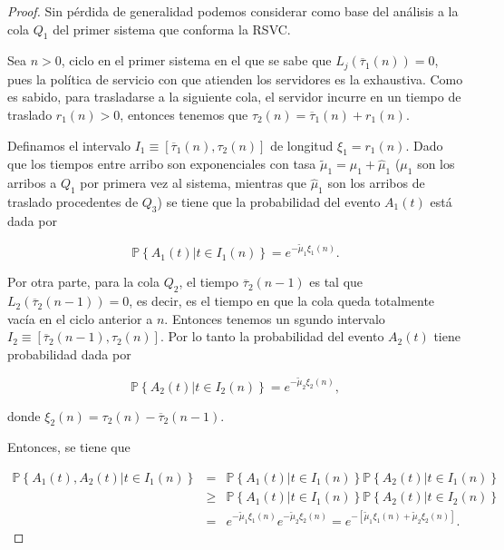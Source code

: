 \documentclass{article}
\newcommand{\prob}{\mathbb{P}}
\begin{document}
\begin{proof}
Sin p\'erdida de generalidad podemos considerar como base del an\'alisis a la cola $Q_{1}$ del primer sistema que conforma la RSVC.

Sea $n>0$, ciclo en el primer sistema en el que se sabe que $L_{j}\left(\overline{\tau}_{1}\left(n\right)\right)=0$, pues la pol\'itica de servicio con que atienden los servidores es la exhaustiva. Como es sabido, para trasladarse a la siguiente cola, el servidor incurre en un tiempo de traslado $r_{1}\left(n\right)>0$, entonces tenemos que $\tau_{2}\left(n\right)=\overline{\tau}_{1}\left(n\right)+r_{1}\left(n\right)$.


Definamos el intervalo $I_{1}\equiv\left[\overline{\tau}_{1}\left(n\right),\tau_{2}\left(n\right)\right]$ de longitud $\xi_{1}=r_{1}\left(n\right)$. Dado que los tiempos entre arribo son exponenciales con tasa $\tilde{\mu}_{1}=\mu_{1}+\hat{\mu}_{1}$ ($\mu_{1}$ son los arribos a $Q_{1}$ por primera vez al sistema, mientras que $\hat{\mu}_{1}$ son los arribos de traslado procedentes de $Q_{3}$) se tiene que la probabilidad del evento $A_{1}\left(t\right)$ est\'a dada por 

\begin{equation}
\prob\left\{A_{1}\left(t\right)|t\in I_{1}\left(n\right)\right\}=e^{-\tilde{\mu}_{1}\xi_{1}\left(n\right)}.
\end{equation} 

Por otra parte, para la cola $Q_{2}$, el tiempo $\overline{\tau}_{2}\left(n-1\right)$ es tal que $L_{2}\left(\overline{\tau}_{2}\left(n-1\right)\right)=0$, es decir, es el tiempo en que la cola queda totalmente vac\'ia en el ciclo anterior a $n$. Entonces tenemos un sgundo intervalo $I_{2}\equiv\left[\overline{\tau}_{2}\left(n-1\right),\tau_{2}\left(n\right)\right]$. Por lo tanto la probabilidad del evento $A_{2}\left(t\right)$ tiene probabilidad dada por

\begin{equation}
\prob\left\{A_{2}\left(t\right)|t\in I_{2}\left(n\right)\right\}=e^{-\tilde{\mu}_{2}\xi_{2}\left(n\right)},
\end{equation} 

donde $\xi_{2}\left(n\right)=\tau_{2}\left(n\right)-\overline{\tau}_{2}\left(n-1\right)$.



Entonces, se tiene que

\begin{eqnarray*}
\prob\left\{A_{1}\left(t\right),A_{2}\left(t\right)|t\in I_{1}\left(n\right)\right\}&=&
\prob\left\{A_{1}\left(t\right)|t\in I_{1}\left(n\right)\right\}
\prob\left\{A_{2}\left(t\right)|t\in I_{1}\left(n\right)\right\}\\
&\geq&
\prob\left\{A_{1}\left(t\right)|t\in I_{1}\left(n\right)\right\}
\prob\left\{A_{2}\left(t\right)|t\in I_{2}\left(n\right)\right\}\\
&=&e^{-\tilde{\mu}_{1}\xi_{1}\left(n\right)}e^{-\tilde{\mu}_{2}\xi_{2}\left(n\right)}
=e^{-\left[\tilde{\mu}_{1}\xi_{1}\left(n\right)+\tilde{\mu}_{2}\xi_{2}\left(n\right)\right]}.
\end{eqnarray*}



\end{proof}
\end{document}
